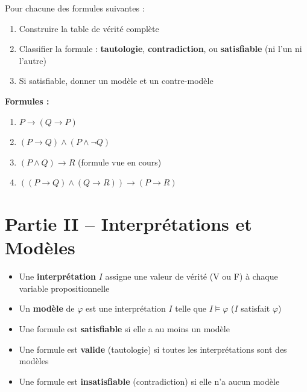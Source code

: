 \documentclass[11pt,a4paper]{article}
\begin{document}
\begin{exercice}
Pour chacune des formules suivantes :
\begin{enumerate}[label=\alph*)]
    \item Construire la table de vérité complète
    \item Classifier la formule : \textbf{tautologie}, \textbf{contradiction}, ou \textbf{satisfiable} (ni l'un ni l'autre)
    \item Si satisfiable, donner un modèle et un contre-modèle
\end{enumerate}

\textbf{Formules :}
\begin{enumerate}
    \item $P \rightarrow (Q \rightarrow P)$
    \item $(P \rightarrow Q) \land (P \land \neg Q)$
    \item $(P \land Q) \rightarrow R$ \quad (formule vue en cours)
    \item $((P \rightarrow Q) \land (Q \rightarrow R)) \rightarrow (P \rightarrow R)$
\end{enumerate}
\end{exercice}

\part*{Partie II -- Interprétations et Modèles}

\begin{rappelbox}
\begin{itemize}
    \item Une \textbf{interprétation} $I$ assigne une valeur de vérité (V ou F) à chaque variable propositionnelle
    \item Un \textbf{modèle} de $\varphi$ est une interprétation $I$ telle que $I \models \varphi$ ($I$ satisfait $\varphi$)
    \item Une formule est \textbf{satisfiable} si elle a au moins un modèle
    \item Une formule est \textbf{valide} (tautologie) si toutes les interprétations sont des modèles
    \item Une formule est \textbf{insatisfiable} (contradiction) si elle n'a aucun modèle
\end{itemize}
\end{rappelbox}
\end{document}
